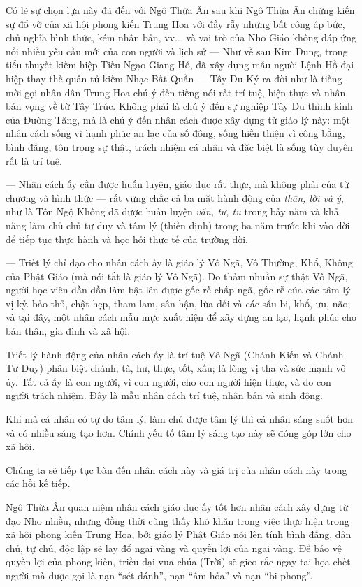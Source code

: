 Có lẽ sự chọn lựa này đã đến với Ngô Thừa Ân sau khi Ngô Thừa Ân chứng kiến sự đổ vỡ của xã hội phong kiến Trung Hoa với đầy rẫy những bất công áp bức, chủ nghĩa hình thức, kém nhân bản, vv\ldots ~và vai trò của Nho Giáo không đáp ứng nổi nhiều yêu cầu mới của con người và lịch sử --- Như về sau Kim Dung, trong tiểu thuyết kiếm hiệp Tiếu Ngạo Giang Hồ, đã xây dựng mẫu người Lệnh Hồ đại hiệp thay thế quân tử kiếm Nhạc Bất Quần --- Tây Du Ký ra đời như là tiếng mời gọi nhân dân Trung Hoa chú ý đến tiếng nói rất trí tuệ, hiện thực và nhân bản vọng về từ Tây Trúc. Không phải là chú ý đến sự nghiệp Tây Du thỉnh kinh của Đường Tăng, mà là chú ý đến nhân cách được xây dựng từ giáo lý này: một nhân cách sống vì hạnh phúc an lạc của số đông, sống hiền thiện vì công bằng, bình đẳng, tôn trọng sự thật, trách nhiệm cá nhân và đặc biệt là sống tùy duyên rất là trí tuệ.

--- Nhân cách ấy cần được huấn luyện, giáo dục rất thực, mà không phải của từ chương và hình thức --- rất vững chắc cả ba mặt hành động của \emph{thân, lời và ý}, như là Tôn Ngộ Không đã được huấn luyện \emph{văn, tư, tu} trong bảy năm và khả năng làm chủ chủ tư duy và tâm lý (thiền định) trong ba năm trước khi vào đời để tiếp tục thực hành và học hỏi thực tế của trường đời.

--- Triết lý chỉ đạo cho nhân cách ấy là giáo lý Vô Ngã, Vô Thường, Khổ, Không của Phật Giáo (mà nói tắt là giáo lý Vô Ngã). Do thấm nhuần sự thật Vô Ngã, người học viên dần dần làm bật lên được gốc rễ chấp ngã, gốc rễ của các tâm lý vị kỷ. bảo thủ, chật hẹp, tham lam, sân hận, lừa dối và các sầu bi, khổ, ưu, não; và tại đây, một nhân cách mẫu mực xuất hiện để xây dựng an lạc, hạnh phúc cho bản thân, gia đình và xã hội.

Triết lý hành động của nhân cách ấy là trí tuệ Vô Ngã (Chánh Kiến và Chánh Tư Duy) phân biệt chánh, tà, hư, thực, tốt, xấu; là lòng vị tha và sức mạnh vô úy. Tất cả ấy là con người, vì con người, cho con người hiện thực, và do con người trách nhiệm. Đây là mẫu nhân cách trí tuệ, nhân bản và sinh động.

Khi mà cá nhân có tự do tâm lý, làm chủ được tâm lý thì cá nhân sáng suốt hơn và có nhiều sáng tạo hơn. Chính yếu tố tâm lý sáng tạo này sẽ đóng góp lớn cho xã hội.

Chúng ta sẽ tiếp tục bàn đến nhân cách này và giá trị của nhân cách này trong các hồi kế tiếp.

Ngô Thừa Ân quan niệm nhân cách giáo dục ấy tốt hơn nhân cách xây dựng từ đạo Nho nhiều, nhưng đồng thời cũng thấy khó khăn trong việc thực hiện trong xã hội phong kiến Trung Hoa, bởi giáo lý Phật Giáo nói lên tính bình đẳng, dân chủ, tự chủ, độc lập sẽ lay đổ ngai vàng và quyền lợi của ngai vàng. Để bảo vệ quyền lợi của phong kiến, triều đại vua chúa (Trời) sẽ gieo rắc ngay tai họa chết người mà được gọi là nạn ``sét đánh'', nạn ``âm hỏa'' và nạn ``bi phong''.

